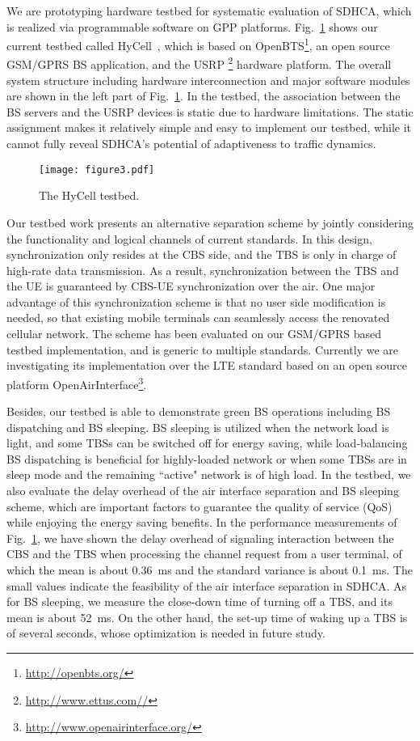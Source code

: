 \documentclass[12pt, draftclsnofoot,onecolumn]{IEEEtran}
\begin{document}
We are prototyping hardware testbed for systematic evaluation of SDHCA, which
is realized via programmable software on GPP platforms.
Fig.~\ref{fig:testbed} shows our current testbed called
HyCell~\cite{zhao2015hycell}, which is
based on OpenBTS\footnote{\url{http://openbts.org/}}, an open source GSM/GPRS BS application,
and the USRP \footnote{\url{http://www.ettus.com//}} hardware platform.
The overall system structure including hardware interconnection and major
software modules are shown in the left part of Fig.~\ref{fig:testbed}. In the testbed, the association between the BS servers and the USRP devices is static due to hardware limitations. The static assignment makes it relatively simple and easy to implement our testbed, while it cannot fully reveal SDHCA's potential of adaptiveness to traffic dynamics.

\begin{figure}[!t]
  \centering
  \texttt{[image: figure3.pdf]}
  \caption{The HyCell testbed.}
  \label{fig:testbed}
\end{figure}

Our testbed work presents an alternative separation scheme by jointly
considering the functionality and logical channels of current standards. In
this design, synchronization only resides at the CBS side, and the TBS is only
in charge of high-rate data transmission. As a result, synchronization between
the TBS and the UE is guaranteed by CBS-UE synchronization over the air.
One major advantage of this synchronization scheme is that no user side modification is needed,
so that existing mobile terminals can seamlessly access the renovated cellular network.
The scheme has been evaluated on our GSM/GPRS based testbed implementation,
and is generic to multiple standards.
Currently we are investigating its implementation over the LTE standard based on
an open source platform OpenAirInterface\footnote{\url{http://www.openairinterface.org/}}.

Besides, our testbed is able to demonstrate green BS operations including BS
dispatching and BS sleeping. BS sleeping is utilized when the network load is light, and
some TBSs can be switched off for energy saving, while load-balancing BS dispatching is beneficial for highly-loaded network or when some TBSs are in sleep mode and the remaining ``active" network is of high load.
In the testbed, we also evaluate the delay overhead of the air interface separation and BS sleeping scheme, which are important factors to guarantee the quality of service (QoS) while enjoying the energy saving benefits.
In the performance measurements of Fig.~\ref{fig:testbed}, we have shown the delay overhead of signaling interaction between the CBS and the TBS when processing the channel request from a user terminal, of which the mean is about \SI{0.36}{ms} and the standard variance is about \SI{0.1}{ms}. The small values indicate the feasibility of the air interface separation in SDHCA. As for BS sleeping, we measure the close-down time of turning off a TBS, and its mean is about \SI{52}{ms}. On the other hand, the set-up time of waking up a TBS is of several seconds, whose optimization is needed in future study.
\end{document}
